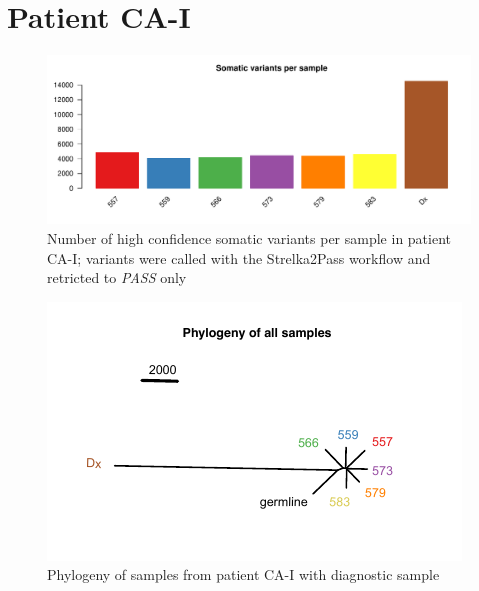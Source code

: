 \section{Patient CA-I}

\begin{figure}[ht]
\centering
\includegraphics[width=.99\linewidth]{Figures/CASCADE/CA51/CA51numVars.pdf}
\caption[Number of somatic variants per sample in patient CA-I]{Number of high confidence somatic variants per sample in patient CA-I; variants were called with the Strelka2Pass workflow and retricted to \emph{PASS} only} \label{fig:ca51numVars}
\end{figure}

\begin{figure}[ht]
\centering
\includegraphics[width=.99\linewidth]{Figures/CASCADE/CA51/CA51phyloWithDx.pdf}
\caption[Phylogeny of samples from patient CA-I with diagnostic sample]{Phylogeny of samples from patient CA-I with diagnostic sample} \label{fig:ca51phyloWithDx}
\end{figure}




